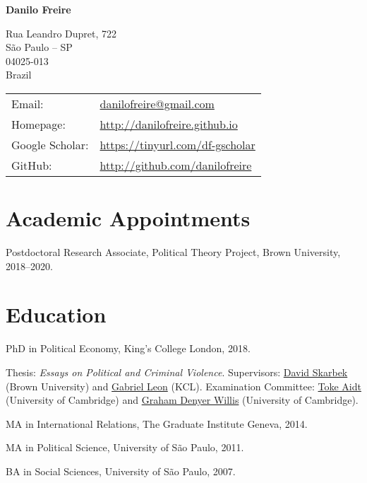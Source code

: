 \documentclass[a4paper]{article}
\def\name{Danilo Freire}
\renewenvironment{itemize}{
	\begin{list}{}{
			\setlength{\leftmargin}{1.5em}
		}
		}{
	\end{list}
}
\begin{document}
{\huge \bf \name}


\vspace{0.25in}

\begin{minipage}{0.45\linewidth}
	Rua Leandro Dupret, 722\\
	São Paulo -- SP\\
	04025-013\\
	Brazil
\end{minipage}
\begin{minipage}{0.45\linewidth}
	\begin{tabular}{ll}
		Email:          & \href{mailto:danilofreire@gmail.com}{danilofreire@gmail.com}          \\
		Homepage:       & \href{http://danilofreire.github.io/}{http://danilofreire.github.io}   \\
    Google Scholar: & \href{https://tinyurl.com/df-gscholar}{https://tinyurl.com/df-gscholar} \\
		GitHub:         & \href{http://github.com/danilofreire}{http://github.com/danilofreire}
	\end{tabular}
	\end{minipage}

\section*{Academic Appointments}

\begin{itemize}
\item Postdoctoral Research Associate, Political Theory Project, Brown University, 2018--2020.
\end{itemize}

\section*{Education}

\begin{itemize}
\item PhD in Political Economy, King's College London, 2018.
\begin{itemize}
\item Thesis: \textit{Essays on Political and Criminal Violence}. Supervisors: \href{http://davidskarbek.com}{David Skarbek} (Brown University) and \href{https://gabrieljleon.wordpress.com/}{Gabriel Leon} (KCL). Examination Committee: \href{http://www.econ.cam.ac.uk/people/faculty/tsa23}{Toke Aidt} (University of Cambridge) and \href{http://www.grahamdenyerwillis.com}{Graham Denyer Willis} (University of Cambridge).
\end{itemize}
\item MA in International Relations, The Graduate Institute Geneva, 2014.
\item MA in Political Science, University of São Paulo, 2011.
\item BA in Social Sciences, University of São Paulo, 2007.
\end{itemize}
\end{document}
